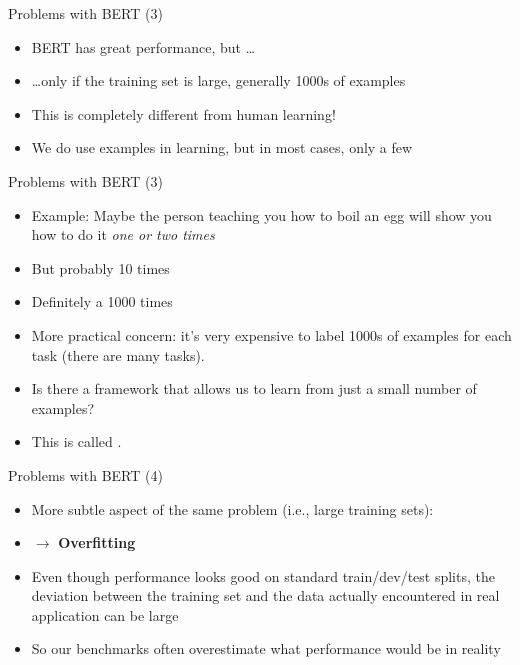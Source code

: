 \documentclass[11pt,compress,t,notes=noshow, xcolor=table]{beamer}
\begin{document}
\begin{frame}{Problems with BERT (3)}

\vfill

  \begin{itemize}
\item BERT has great performance, but \ldots
\item \ldots only if the training set is large, generally 1000s of examples
\item This is completely different from human learning!
\item We do use examples in learning, but in most cases, only a few
\end{itemize}

\vfill

\end{frame}


\begin{frame}{Problems with BERT (3)}

\vfill

  \begin{itemize}
\item Example: Maybe the person teaching you how to boil an egg will show you how to do it \textit{one or two times}
\item But probably  10 times
\item Definitely  a 1000 times 
\item More practical concern: it's very expensive to label 1000s of examples for each task (there are many tasks).
\item \ques Is there a framework that allows us to learn from just a small number of examples?
\item This is called .
    \end{itemize}

\vfill

\end{frame}


\begin{frame}{Problems with BERT (4)}

\vfill

  \begin{itemize}
		\item More subtle aspect of the same problem (i.e., large training sets):
		\item[] $\to$ \textbf{Overfitting}
		\item Even though performance looks good on standard train/dev/test splits, the deviation between the training set and the
data actually encountered in real application can be large
		\item So our benchmarks often overestimate what performance would be in reality
  \end{itemize}

\vfill

\end{frame}
\end{document}

